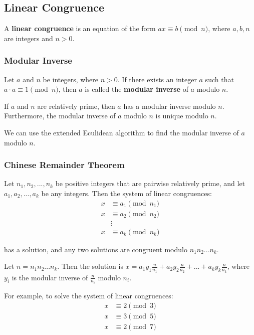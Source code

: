 \documentclass[a4paper,12pt]{article}
\begin{document}
\subsection{Linear Congruence}

A \textbf{linear congruence} is an equation of the form $ax \equiv b \pmod{n}$, where $a,b,n$ are integers and $n > 0$.

\subsubsection{Modular Inverse}

Let $a$ and $n$ be integers, where $n > 0$.
If there exists an integer $\overline{a}$ such that $a \cdot \overline{a} \equiv 1 \pmod{n}$, then $\overline{a}$ is called the \textbf{modular inverse} of $a$ modulo $n$.

If $a$ and $n$ are relatively prime, then $a$ has a modular inverse modulo $n$.
Furthermore, the modular inverse of $a$ modulo $n$ is unique modulo $n$.

We can use the extended Eculidean algorithm to find the modular inverse of $a$ modulo $n$.

\subsubsection{Chinese Remainder Theorem}

Let $n_1, n_2, ..., n_k$ be positive integers that are pairwise relatively prime, and let $a_1, a_2, ..., a_k$ be any integers.
Then the system of linear congruences:
\begin{align*}
	x &\equiv a_1 \pmod{n_1} \\
	x &\equiv a_2 \pmod{n_2} \\
	&\vdots \\
	x &\equiv a_k \pmod{n_k}
\end{align*}

has a solution, and any two solutions are congruent modulo $n_1 n_2 ... n_k$.

Let $n = n_1 n_2 ... n_k$.
Then the solution is $x = a_1 y_1 \frac{n}{n_1} + a_2 y_2 \frac{n}{n_2} + ... + a_k y_k \frac{n}{n_k}$, where $y_i$ is the modular inverse of $\frac{n}{n_i}$ modulo $n_i$.

For example, to solve the system of linear congruences:
\begin{align*}
	x &\equiv 2 \pmod{3} \\
	x &\equiv 3 \pmod{5} \\
	x &\equiv 2 \pmod{7}
\end{align*}
\end{document}
